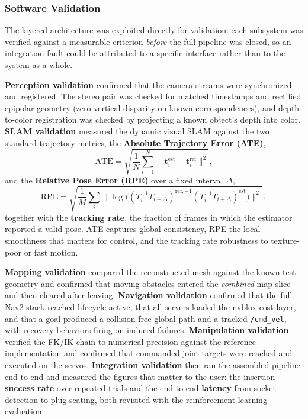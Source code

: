 \subsubsection{Software Validation}\label{sec:validation}

The layered architecture was exploited directly for validation: each subsystem was verified against a measurable criterion \emph{before} the full pipeline was closed, so an integration fault could be attributed to a specific interface rather than to the system as a whole.

\textbf{Perception validation} confirmed that the camera streams were synchronized and registered. The stereo pair was checked for matched timestamps and rectified epipolar geometry (zero vertical disparity on known correspondences), and depth-to-color registration was checked by projecting a known object's depth into color. \textbf{SLAM validation} measured the dynamic visual SLAM against the two standard trajectory metrics, the \textbf{Absolute Trajectory Error (ATE)},
$$
\mathrm{ATE}=\sqrt{\frac{1}{N}\sum_{i=1}^{N}\big\lVert \mathbf{t}_i^{\text{est}}-\mathbf{t}_i^{\text{ref}}\big\rVert^2},
$$
and the \textbf{Relative Pose Error (RPE)} over a fixed interval $\Delta$,
$$
\mathrm{RPE}=\sqrt{\frac{1}{M}\sum_{i}\big\lVert \operatorname{log}\!\big((T_{i}^{-1}T_{i+\Delta})^{\text{ref},-1}(T_{i}^{-1}T_{i+\Delta})^{\text{est}}\big)\big\rVert^2}\,,
$$
together with the \textbf{tracking rate}, the fraction of frames in which the estimator reported a valid pose. ATE captures global consistency, RPE the local smoothness that matters for control, and the tracking rate robustness to texture-poor or fast motion.

\textbf{Mapping validation} compared the reconstructed mesh against the known test geometry and confirmed that moving obstacles entered the \emph{combined} map slice and then cleared after leaving. \textbf{Navigation validation} confirmed that the full Nav2 stack reached lifecycle-active, that all servers loaded the nvblox cost layer, and that a goal produced a collision-free global path and a tracked \texttt{/cmd\_vel}, with recovery behaviors firing on induced failures. \textbf{Manipulation validation} verified the FK/IK chain to numerical precision against the reference implementation and confirmed that commanded joint targets were reached and executed on the servos. \textbf{Integration validation} then ran the assembled pipeline end to end and measured the figures that matter to the user: the insertion \textbf{success rate} over repeated trials and the end-to-end \textbf{latency} from socket detection to plug seating, both revisited with the reinforcement-learning evaluation.
